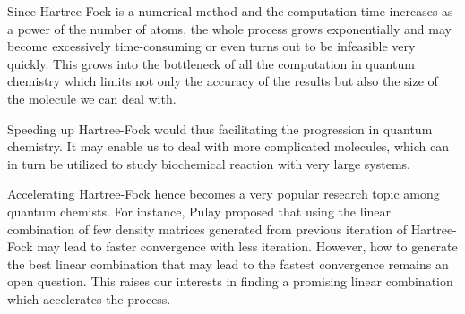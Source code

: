 \documentclass[twoside]{article}
\begin{document}
Since Hartree-Fock is a numerical method and the computation time increases as a power of the number of atoms, the whole process grows exponentially and may become excessively time-consuming or even turns out to be infeasible very quickly.
This grows into the bottleneck of all the computation in quantum chemistry which limits not only the accuracy of the results but also the size of the molecule we can deal with.

Speeding up Hartree-Fock would thus facilitating the progression in quantum chemistry. It may enable us to deal with more complicated molecules, which can in turn be utilized to study biochemical reaction with very large systems. 





Accelerating Hartree-Fock hence becomes a very popular research topic among quantum chemists. For instance, Pulay \cite{Pulay1980} proposed that using the linear combination of few density matrices generated from previous iteration of Hartree-Fock may lead to faster convergence with less iteration. However, how to generate the best linear combination that may lead to the fastest convergence remains an open question. This raises our interests in finding a promising linear combination which accelerates the process. %


\end{document}
